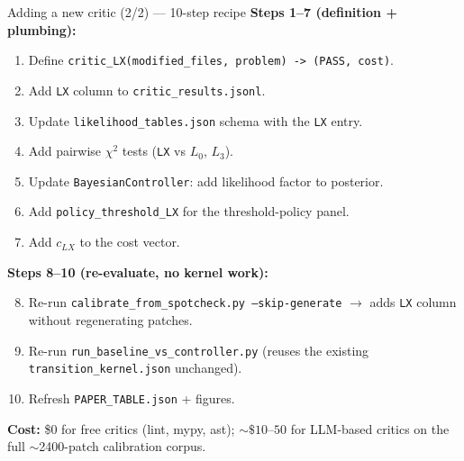 \documentclass[10pt]{beamer}
\newcommand{\info}[1]{\textcolor{primaryBlue}{\textbf{#1}}}
\begin{document}
\begin{frame}{Adding a new critic (2/2) --- 10-step recipe}
\vspace{0.1cm}
\small
\textbf{Steps 1--7 (definition + plumbing):}
\begin{enumerate}\setlength\itemsep{0pt}
\item Define \texttt{critic\_LX(modified\_files, problem) -> (PASS, cost)}.
\item Add \texttt{LX} column to \texttt{critic\_results.jsonl}.
\item Update \texttt{likelihood\_tables.json} schema with the \texttt{LX} entry.
\item Add pairwise $\chi^2$ tests (\texttt{LX} vs $L_0$, $L_3$).
\item Update \texttt{BayesianController}: add likelihood factor to posterior.
\item Add \texttt{policy\_threshold\_LX} for the threshold-policy panel.
\item Add $c_{LX}$ to the cost vector.
\end{enumerate}

\vspace{0.1cm}
\textbf{Steps 8--10 (re-evaluate, no kernel work):}
\begin{enumerate}\setcounter{enumi}{7}\setlength\itemsep{0pt}
\item Re-run \texttt{calibrate\_from\_spotcheck.py --skip-generate} $\to$ adds
   \texttt{LX} column without regenerating patches.
\item Re-run \texttt{run\_baseline\_vs\_controller.py} (reuses the existing
   \texttt{transition\_kernel.json} unchanged).
\item Refresh \texttt{PAPER\_TABLE.json} + figures.
\end{enumerate}

\vspace{0.2cm}
\info{Cost:} \$0 for free critics (lint, mypy, ast); ${\sim}\$10$--$50$ for
LLM-based critics on the full $\sim$2400-patch calibration corpus.
\end{frame}
\end{document}
